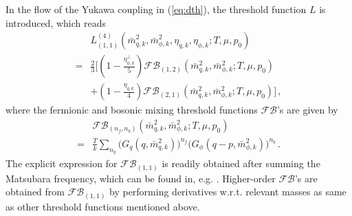 \documentclass[%
reprint,
superscriptaddress,
showpacs,preprintnumbers,
 amsmath,amssymb,
 aps,
prd,
]{revtex4-1}
\begin{document}
In the flow of the Yukawa coupling in (\ref{eq:dth}), the threshold function $L$ is introduced, which reads
\begin{align}
  &L^{(4)}_{(1,1)}(\bar{m}^{2}_{q,k},\bar{m}^{2}_{\phi,k},\eta_{q,k},\eta_{\phi,k};T,\mu,p_0)\nonumber\\[2ex]
  =&\frac{2}{3}\bigg[\left(1-\frac{\eta_{\phi,k}^{\perp}}{5}\right)\mathcal{FB}_{(1,2)}(\bar{m}^{2}_{q,k},\bar{m}^{2}_{\phi,k};T,\mu,p_0)\nonumber\\[2ex]
&+\left(1-\frac{\eta_{q,k}}{4}\right)\mathcal{FB}_{(2,1)}(\bar{m}^{2}_{q,k},\bar{m}^{2}_{\phi,k};T,\mu,p_0)\bigg]\,,
\end{align} 
where the fermionic and bosonic mixing threshold functions $\mathcal{FB}$'s are given by
\begin{align}
 &\mathcal{FB}_{(n_f,n_b)}(\bar{m}^{2}_{q,k},\bar{m}^{2}_{\phi,k};T,\mu,p_0)\nonumber \\[2ex] 
  =&\frac{T}{k}\sum_{n_q}\Big(G_{q}(q,\bar{m}^{2}_{q,k})\Big)^{n_f}\Big(G_{\phi}(q-p,\bar{m}^{2}_{\phi,k})\Big)^{n_b}\,.\label{eq:FB}
\end{align}
The explicit expression for $\mathcal{FB}_{(1,1)}$ is readily obtained after summing the Matsubara frequency, which can be found in, e.g. \cite{Fu:2015naa}. Higher-order $\mathcal{FB}$'s are obtained from $\mathcal{FB}_{(1,1)}$ by performing derivatives w.r.t. relevant masses as same as other threshold functions mentioned above.

\end{document}

